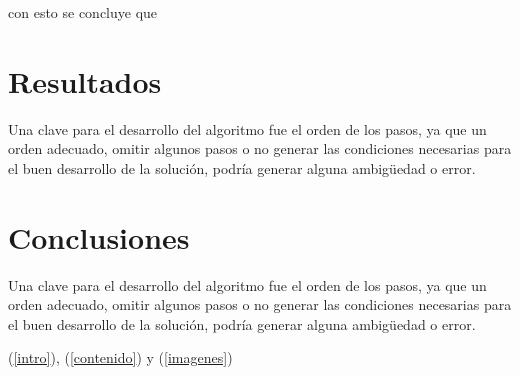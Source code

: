 \documentclass{article}
\begin{document}
con esto se concluye que 


\section{Resultados} \label{conclusiones}
Una clave para el desarrollo del algoritmo fue el orden de los pasos, ya que un orden adecuado, omitir algunos pasos o no generar las condiciones necesarias para el buen desarrollo de la solución, podría generar alguna ambigüedad o error.

\section{Conclusiones} \label{conclusiones}
Una clave para el desarrollo del algoritmo fue el orden de los pasos, ya que un orden adecuado, omitir algunos pasos o no generar las condiciones necesarias para el buen desarrollo de la solución, podría generar alguna ambigüedad o error.



(\ref{intro}), (\ref{contenido}) y (\ref{imagenes})


\end{document}
